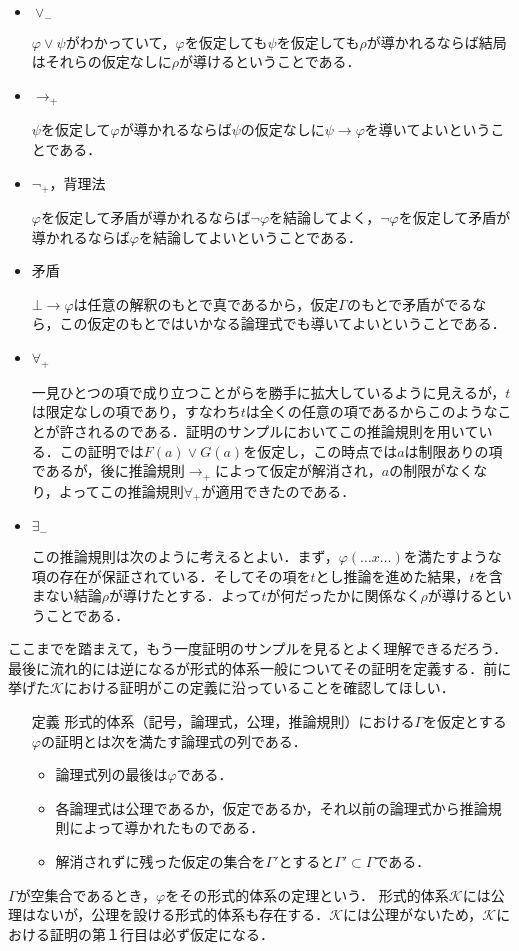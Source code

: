 \documentclass[10pt,b5paper,papersize,dvipdfmx]{jsbook}
\begin{document}
\begin{itemize}
\item $\lor_-$ \par
$\varphi \lor \psi$がわかっていて，$\varphi$を仮定しても$\psi$を仮定しても$\rho$が導かれるならば結局はそれらの仮定なしに$\rho$が導けるということである．
\item $\to_+$ \par
$\psi$を仮定して$\varphi$が導かれるならば$\psi$の仮定なしに$\psi \to \varphi$を導いてよいということである．
\item $\lnot_+$，背理法 \par
$\varphi$を仮定して矛盾が導かれるならば$\lnot \varphi$を結論してよく，$\lnot \varphi$を仮定して矛盾が導かれるならば$\varphi$を結論してよいということである．
\item 矛盾 \par
$\bot \to \varphi$は任意の解釈のもとで真であるから，仮定$\Gamma$のもとで矛盾がでるなら，この仮定のもとではいかなる論理式でも導いてよいということである．
\item $\forall_+$ \par
一見ひとつの項で成り立つことがらを勝手に拡大しているように見えるが，$t$は限定なしの項であり，すなわち$t$は全くの任意の項であるからこのようなことが許されるのである．証明のサンプルにおいてこの推論規則を用いている．この証明では$F(a)\lor G(a)$を仮定し，この時点では$a$は制限ありの項であるが，後に推論規則$\to_+$によって仮定が解消され，$a$の制限がなくなり，よってこの推論規則$\forall_+$が適用できたのである．
\item $\exists_-$ \par
この推論規則は次のように考えるとよい．まず，$\varphi(\dots x \dots)$を満たすような項の存在が保証されている．そしてその項を$t$とし推論を進めた結果，$t$を含まない結論$\rho$が導けたとする．よって$t$が何だったかに関係なく$\rho$が導けるということである．
\end{itemize}
ここまでを踏まえて，もう一度証明のサンプルを見るとよく理解できるだろう．最後に流れ的には逆になるが形式的体系一般についてその証明を定義する．前に挙げた$\mathcal K$における証明がこの定義に沿っていることを確認してほしい．
\begin{itemize}
\item[定義] 形式的体系（記号，論理式，公理，推論規則）における$\Gamma$を仮定とする$\varphi$の証明とは次を満たす論理式の列である．
\begin{itemize}
\item 論理式列の最後は$\varphi$である．
\item 各論理式は公理であるか，仮定であるか，それ以前の論理式から推論規則によって導かれたものである．
\item 解消されずに残った仮定の集合を$\Gamma'$とすると$\Gamma'\subset \Gamma$である．
\end{itemize}
\end{itemize}
$\Gamma$が空集合であるとき，$\varphi$をその形式的体系の定理という．
形式的体系$\mathcal K$には公理はないが，公理を設ける形式的体系も存在する．$\mathcal K$には公理がないため，$\mathcal K$における証明の第１行目は必ず仮定になる．
\end{document}
